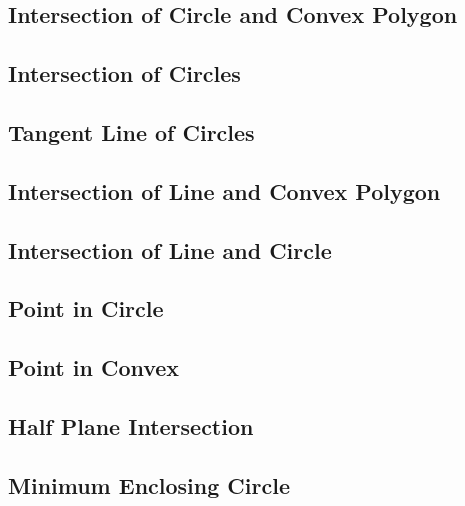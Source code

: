 \documentclass[a4paper,10pt,oneside]{article}
\begin{document}
\subsection{Intersection of Circle and Convex Polygon}


\subsection{Intersection of Circles}


\subsection{Tangent Line of Circles}


\subsection{Intersection of Line and Convex Polygon}


\subsection{Intersection of Line and Circle}


\subsection{Point in Circle}


\subsection{Point in Convex}


\subsection{Half Plane Intersection}


\subsection{Minimum Enclosing Circle}

\end{document}
